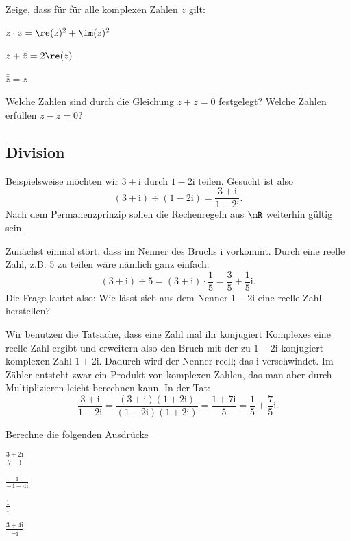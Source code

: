 \documentclass[%
11pt,%
twoside,%
titlepage,%
german,%
headsepline%
]{scrartcl}
\begin{document}
\begin{ueb}[$z$ bar]
Zeige, dass f\"ur f\"ur alle komplexen Zahlen $z$ gilt:
\begin{enumeratea}
\item $z\cdot \bar{z}=\re(z)^2+\im(z)^2$
\item $z+\bar{z}=2\re(z)$
\item $\bar{\bar{z}}=z$
\end{enumeratea}
\end{ueb}

\begin{ueb}[Achsen]
Welche Zahlen sind durch die Gleichung $z+\bar{z}=0$ festgelegt? Welche Zahlen erf\"ullen $z-\bar{z}=0$?
\end{ueb}

\subsection{Division}

Beispielsweise m\"ochten wir $3+\mathrm{i}$ durch $1-2\mathrm{i}$ teilen. Gesucht ist also
$$(3+\mathrm{i})\div(1-2\mathrm{i})=\frac{3+\mathrm{i}}{1-2\mathrm{i}}.$$
Nach dem Permanenzprinzip sollen die Rechenregeln aus $\mR$ weiterhin g\"ultig sein.

Zunächst einmal st\"ort, dass im Nenner des Bruchs $\mathrm{i}$ vorkommt. Durch eine
reelle Zahl, z.B. 5 zu teilen wäre nämlich ganz einfach:
$$(3+\mathrm{i})\div5=(3+\mathrm{i})\cdot\frac{1}{5}=\frac{3}{5}+\frac{1}{5}\mathrm{i}.$$
Die Frage lautet also: Wie lässt sich aus dem Nenner $1-2\mathrm{i}$ eine reelle Zahl herstellen?

Wir benutzen die Tatsache, dass eine Zahl mal ihr konjugiert Komplexes eine reelle Zahl ergibt und erweitern also den Bruch mit der zu $1 - 2\mathrm{i}$ konjugiert komplexen Zahl $1 + 2\mathrm{i}$. Dadurch wird der Nenner reell; das $\mathrm{i}$ \glqq verschwindet\grqq. Im Zähler entsteht zwar ein Produkt von komplexen Zahlen, das man aber durch Multiplizieren leicht berechnen kann. In der Tat:
$$\frac{3+\mathrm{i}}{1-2\mathrm{i}}=\frac{(3+\mathrm{i})(1+2\mathrm{i})}{(1-2\mathrm{i})(1+2\mathrm{i})}=\frac{1+7\mathrm{i}}{5}=\frac{1}{5}+\frac{7}{5}\mathrm{i}.$$

\begin{ueb}[Division]
Berechne die folgenden Ausdr\"ucke

\begin{minipage}{3.5cm}
\begin{enumeratea}
\item $\frac{3+2\mathrm{i}}{7-\mathrm{i}}$
\item $\frac{\mathrm{i}}{-4-4\mathrm{i}}$
\end{enumeratea}
\end{minipage}
\begin{minipage}{3.5cm}
\begin{enumeratea}
\setcounter{enumi}{2}
\item $\frac{1}{\mathrm{i}}$
\item $\frac{3+4\mathrm{i}}{-\mathrm{i}}$
\end{enumeratea}
\end{minipage}
\end{ueb}
\end{document}
